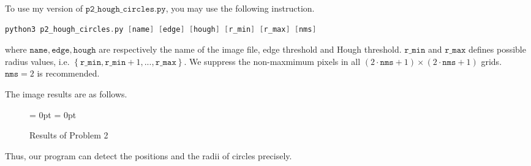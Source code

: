 \documentclass{article}
\newcommand{\set}[1]{\left\{#1\right\}}
\begin{document}
\hspace{-1.8em}
To use my version of $\mathtt{p2\_hough\_circles.py}$, you may use the following instruction.

\small
\begin{lstlisting}[language=c]
    python3 p2_hough_circles.py [name] [edge] [hough] [r_min] [r_max] [nms]
\end{lstlisting}

\hspace{0.5em}
where $\mathtt{name, edge, hough}$ are respectively the name of the image file, edge threshold and Hough threshold. $\mathtt{r\_min}$ and $\mathtt{r\_max}$ defines possible radius values, i.e. $\set{\mathtt{r\_min},\mathtt{r\_min}+1,...,\mathtt{r\_max}}$. We suppress the non-maxmimum pixels in all $(2\cdot\mathtt{nms}+1)\times(2\cdot\mathtt{nms}+1)$ grids. $\mathtt{nms}=2$ is recommended.
 
\normalsize
\vspace{2em} \hspace{-1.8em}
The image results are as follows.

\begin{figure*}[htbp]
    \centering
    \subfigbottomskip = 0pt
    \subfigcapskip = 0pt
    \caption{Results of Problem 2}
\end{figure*}

\vspace{-0.5em} \hspace{-1.8em}
Thus, our program can detect the positions and the radii of circles precisely.
\end{document}
